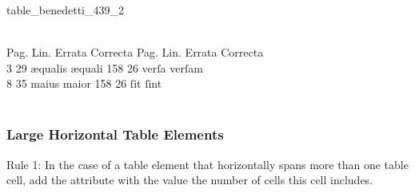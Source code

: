 \begin{sampleImage}{table_benedetti_439_2}
\begin{typeLatin}
 \\
Pag.  Lin.  Errata  Correcta \lwr{} Pag.  Lin.  Errata \lwr{} Correcta \\
3  29  æqualis  æquali \lwr{} 158  26  verſa  verſam \\
8  35  maius  maior \lwr{} 158  26  ſit  ſint \\
\untranscribedText \\
\end{typeLatin}

\end{sampleImage}


\subsubsection{Large Horizontal Table Elements}
\label{section large horizontal table elements}
\begin{mainrule}
  Rule 1: In the case of a table element that horizontally spans more than one table cell, add the attribute  with the value the number of cells this cell includes.
\end{mainrule}



